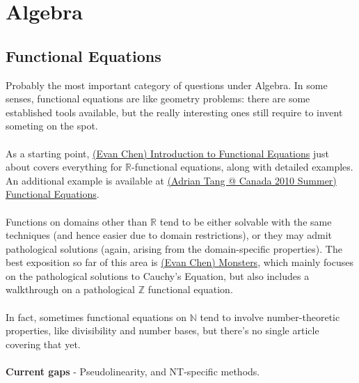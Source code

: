 \section{Algebra}
	
	\subsection{Functional Equations}
	Probably the most important category of questions under Algebra. In some senses, functional equations are like geometry problems: there are some established tools available, but the really interesting ones still require to invent someting on the spot.\\\\
	As a starting point, \href{run:./F_Algebra/(Evan Chen) Introduction to Functional Equations.pdf}{(Evan Chen) Introduction to Functional Equations} just about covers everything for $\mathbb{R}$-functional equations, along with detailed examples. An additional example is available at  \href{run:./F_Algebra/(Adrian Tang @ Canada 2010 Summer) Functional Equations.pdf}{(Adrian Tang @ Canada 2010 Summer) Functional Equations}.\\\\
	Functions on domains other than $\mathbb{R}$ tend to be either solvable with the same techniques (and hence easier due to domain restrictions), or they may admit pathological solutions (again, arising from the domain-specific properties). The best exposition so far of this area is \href{run:./F_Algebra/(Evan Chen) Monsters.pdf}{(Evan Chen) Monsters}, which mainly focuses on the pathological solutions to Cauchy's Equation, but also includes a walkthrough on a pathological $\mathbb{Z}$ functional equation.\\\\
	In fact, sometimes functional equations on $\mathbb{N}$ tend to involve number-theoretic properties, like divisibility and number bases, but there's no single article covering that yet.\\\\
	\textbf{Current gaps} - Pseudolinearity, and NT-specific methods.
